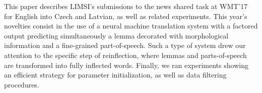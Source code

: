 This paper describes LIMSI's submissions to the news shared task at WMT'17 for English into Czech and Latvian, as well as related experiments. This year's novelties consist in the use of a neural machine translation system with a factored output predicting simultaneously a lemma decorated with morphological information and a fine-grained part-of-speech. Such a type of system drew our attention to the specific step of reinflection, where lemmas and parts-of-speech are transformed into fully inflected words. Finally, we ran experiments showing an efficient strategy for parameter initialization, as well as data filtering procedures.
